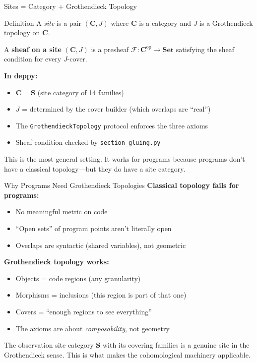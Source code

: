\documentclass[aspectratio=169,10pt]{beamer}
\newcommand{\Fscr}{\mathcal{F}}
\newcommand{\op}{\mathrm{op}}
\newcommand{\Set}{\mathbf{Set}}
\begin{document}
\begin{frame}{Sites = Category + Grothendieck Topology}
\begin{block}{Definition}
A \emph{site} is a pair $(\mathbf{C}, J)$ where $\mathbf{C}$ is a category and $J$ is a Grothendieck topology on $\mathbf{C}$.
\end{block}

A \textbf{sheaf on a site} $(\mathbf{C}, J)$ is a presheaf $\Fscr : \mathbf{C}^{\op} \to \Set$ satisfying the sheaf condition for every $J$-cover.

\vspace{0.5em}
\textbf{In deppy:}
\begin{itemize}
  \item $\mathbf{C} = \mathbf{S}$ (site category of 14 families)
  \item $J$ = determined by the cover builder (which overlaps are ``real'')
  \item The \texttt{GrothendieckTopology} protocol enforces the three axioms
  \item Sheaf condition checked by \texttt{section\_gluing.py}
\end{itemize}

This is the most general setting. It works for programs because programs don't have a classical topology---but they do have a site category.
\end{frame}

\begin{frame}{Why Programs Need Grothendieck Topologies}
\textbf{Classical topology fails for programs:}
\begin{itemize}
  \item No meaningful metric on code
  \item ``Open sets'' of program points aren't literally open
  \item Overlaps are syntactic (shared variables), not geometric
\end{itemize}

\textbf{Grothendieck topology works:}
\begin{itemize}
  \item Objects = code regions (any granularity)
  \item Morphisms = inclusions (this region is part of that one)
  \item Covers = ``enough regions to see everything''
  \item The axioms are about \emph{composability}, not geometry
\end{itemize}

\vspace{0.3em}
The observation site category $\mathbf{S}$ with its covering families is a genuine site in the Grothendieck sense. This is what makes the cohomological machinery applicable.
\end{frame}
\end{document}
